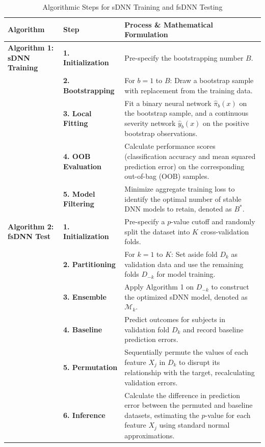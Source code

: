 \begin{table}[htbp]
\centering
\small
\begin{tabularx}{\textwidth}{l l X}
\toprule
\textbf{Algorithm} & \textbf{Step} & \textbf{Process \& Mathematical Formulation} \\
\midrule
\textbf{Algorithm 1: sDNN Training} \cite{zou2025sdnn} & \textbf{1. Initialization} & Pre-specify the bootstrapping number $B$. \cite{zou2025sdnn} \\
\addlinespace
& \textbf{2. Bootstrapping} & For $b = 1$ to $B$: Draw a bootstrap sample with replacement from the training data. \cite{zou2025sdnn} \\
\addlinespace
& \textbf{3. Local Fitting} & Fit a binary neural network $\hat{\pi}_b(x)$ on the bootstrap sample, and a continuous severity network $\hat{y}_b(x)$ on the positive bootstrap observations. \cite{zou2025sdnn} \\
\addlinespace
& \textbf{4. OOB Evaluation} & Calculate performance scores (classification accuracy and mean squared prediction error) on the corresponding out-of-bag (OOB) samples. \cite{zou2025sdnn} \\
\addlinespace
& \textbf{5. Model Filtering} & Minimize aggregate training loss to identify the optimal number of stable DNN models to retain, denoted as $B^*$. \cite{zou2025sdnn} \\
\midrule
\textbf{Algorithm 2: fsDNN Test} \cite{zou2025sdnn} & \textbf{1. Initialization} & Pre-specify a $p$-value cutoff and randomly split the dataset into $K$ cross-validation folds. \cite{zou2025sdnn} \\
\addlinespace
& \textbf{2. Partitioning} & For $k = 1$ to $K$: Set aside fold $D_k$ as validation data and use the remaining folds $D_{-k}$ for model training. \cite{zou2025sdnn} \\
\addlinespace
& \textbf{3. Ensemble} & Apply Algorithm 1 on $D_{-k}$ to construct the optimized sDNN model, denoted as $\mathcal{M}_k$. \cite{zou2025sdnn} \\
\addlinespace
& \textbf{4. Baseline} & Predict outcomes for subjects in validation fold $D_k$ and record baseline prediction errors. \cite{zou2025sdnn} \\
\addlinespace
& \textbf{5. Permutation} & Sequentially permute the values of each feature $X_j$ in $D_k$ to disrupt its relationship with the target, recalculating validation errors. \cite{zou2025sdnn} \\
\addlinespace
& \textbf{6. Inference} & Calculate the difference in prediction error between the permuted and baseline datasets, estimating the $p$-value for each feature $X_j$ using standard normal approximations. \cite{zou2025sdnn} \\
\bottomrule
\end{tabularx}
\caption{Algorithmic Steps for sDNN Training and fsDNN Testing}
\label{tab:sdnn_algorithms}
\end{table}

